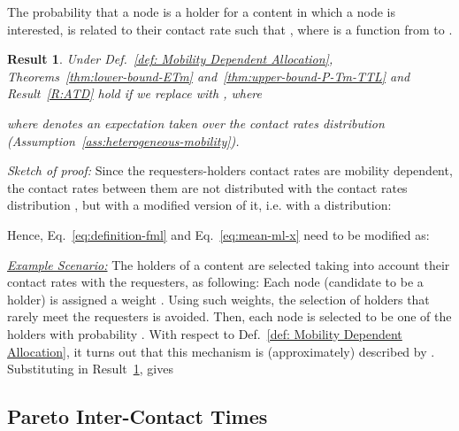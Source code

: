 \documentclass[journal]{IEEEtran}
\newtheorem{result}{Result}
\newcommand{\eq}[1]{Eq.~\eqref{#1}}
\begin{document}
\begin{definition}\label{def: Mobility Dependent Allocation}
The probability  that a node  is a holder for a content in which a node  is interested, is related to their contact rate  such that , where  is a function from  to .
\end{definition}


\begin{result}\label{R:MDA}
 Under Def.~\ref{def: Mobility Dependent Allocation}, Theorems~\ref{thm:lower-bound-ETm} and~\ref{thm:upper-bound-P-Tm-TTL} and Result~\ref{R:ATD} hold if we replace  with , where

where  denotes an expectation taken over the contact rates distribution  (Assumption~\ref{ass:heterogeneous-mobility}).
\end{result}
\textit{Sketch of proof:} Since the requesters-holders contact rates are mobility dependent, the contact rates between them are not distributed with the contact rates distribution , but with a modified version of it, i.e. with a distribution:

Hence, \eq{eq:definition-fml} and \eq{eq:mean-ml-x} need to be modified as:


\textit{\underline{Example Scenario:}} The holders of a content  are selected taking into account their contact rates with the requesters, as following: Each node  (candidate to be a holder) is assigned a weight . Using such weights, the selection of holders that rarely meet the requesters is avoided. Then, each node is selected to be one of the  holders with probability . With respect to Def.~\ref{def: Mobility Dependent Allocation}, it turns out that this mechanism is (approximately) described by . Substituting  in Result~\ref{R:MDA}, gives


\subsection*{\textbf{Pareto Inter-Contact Times}}

\end{document}
